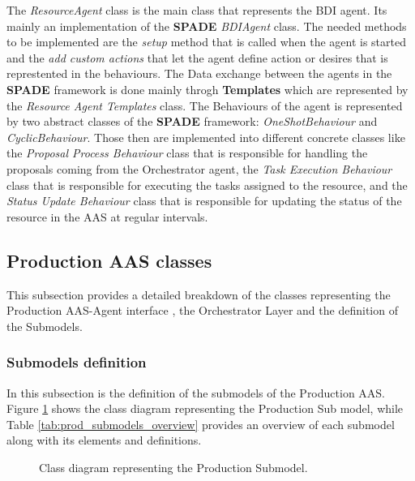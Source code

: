 The \emph{ResourceAgent} class is the main class that represents the BDI agent.
Its mainly an implementation of the \textbf{SPADE} \emph{BDIAgent} class.
The needed methods to be implemented are the \emph{setup} method that is called when the agent is started and the \emph{add custom actions} that let the agent define action or desires that is represtented in the behaviours.
The Data exchange between the agents in the \textbf{SPADE} framework is done mainly throgh \textbf{Templates} which are represented by the \emph{Resource Agent Templates} class.
The Behaviours of the agent is represented by two abstract classes of the \textbf{SPADE} framework: \emph{OneShotBehaviour} and \emph{CyclicBehaviour}.
Those then are implemented into different concrete classes like the \emph{Proposal Process Behaviour} class that is responsible for handling the proposals coming from the Orchestrator agent, the \emph{Task Execution Behaviour} class that is responsible for executing the tasks assigned to the resource, and the \emph{Status Update Behaviour} class that is responsible for updating the status of the resource in the AAS at regular intervals.

\newpage
\subsection{Production AAS classes}
This subsection provides a detailed breakdown of the classes representing the Production AAS-Agent interface , the Orchestrator Layer and the definition of the Submodels.

\subsubsection{Submodels definition}

In this subsection is the definition of the submodels of the Production AAS.
Figure \ref{fig:prod_submodel_classes} shows the class diagram representing the Production Sub
model, while Table \ref{tab:prod_submodels_overview} provides an overview of each submodel along with its elements and definitions.
\begin{figure}[ht]  
    \centering
    
    \caption{Class diagram representing the Production Submodel.}
    \label{fig:prod_submodel_classes}
\end{figure}

